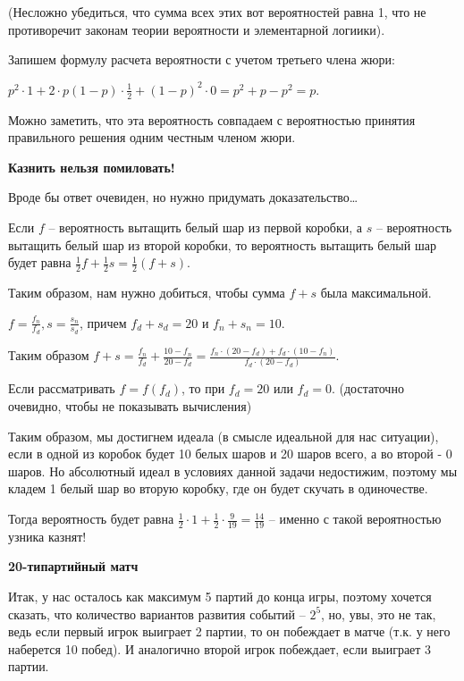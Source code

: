 \documentclass[12pt]{extreport}
\theoremstyle{definiton}
\theoremstyle{definition}
\theoremstyle{definition}
\newcounter{problem}
\newcounter{subproblem}
\def\beforPRskip{
    \bigskip
}
\def\pr{\beforPRskip\noindent\stepcounter{problem}{\bf \theproblem .\;}\setcounter{subproblem}{0}}
\begin{document}
        (Несложно убедиться, что сумма всех этих вот вероятностей равна 1, что не противоречит законам теории вероятности и элементарной логиики).

        Запишем формулу расчета вероятности с учетом третьего члена жюри:

        $p^2 \cdot 1 + 2 \cdot p(1-p) \cdot \frac{1}{2} + (1-p)^2 \cdot 0 = p^2 + p - p^2 = p$.

        Можно заметить, что эта вероятность совпадаем с вероятностью принятия правильного решения одним честным членом жюри.

    \pr \textbf{Казнить нельзя помиловать!}

        Вроде бы ответ очевиден, но нужно придумать доказательство\ldots

        Если $f$ -- вероятность вытащить белый шар из первой коробки, а $s$ -- вероятность вытащить белый шар из второй коробки, то
        вероятность вытащить белый шар будет равна $\frac{1}{2}f + \frac{1}{2}s = \frac{1}{2}(f + s)$.

        Таким образом, нам нужно добиться, чтобы сумма $f + s$ была максимальной.

        $f = \frac{f_n}{f_d}, s = \frac{s_n}{s_d}$, причем $f_d + s_d = 20$ и $f_n + s_n = 10$.

        Таким образом $f + s = \frac{f_n}{f_d} + \frac{10 - f_n}{20 - f_d} = \frac{f_n \cdot (20 - f_d) + f_d \cdot (10 - f_n)}{f_d \cdot (20 - f_d)}$.

        Если рассматривать $f = f(f_d)$, то при $f_d = 20$ или $f_d = 0$. (достаточно очевидно, чтобы не показывать вычисления)

        Таким образом, мы достигнем идеала (в смысле идеальной для нас ситуации), если в одной из коробок будет 10 белых шаров и 20 шаров всего, а во второй - 0 шаров.
        Но абсолютный идеал в условиях данной задачи недостижим, поэтому мы кладем 1 белый шар во вторую коробку, где он будет скучать в одиночестве.

        Тогда вероятность будет равна $\frac{1}{2} \cdot 1 + \frac{1}{2} \cdot \frac{9}{19} = \frac{14}{19}$ -- именно с такой вероятностью узника казнят!

    \pr \textbf{20-типартийный матч}

        Итак, у нас осталось как максимум 5 партий до конца игры, поэтому хочется сказать, что количество вариантов развития событий -- $2^5$,
        но, увы, это не так, ведь если первый игрок выиграет 2 партии, то он побеждает в матче (т.к. у него наберется 10 побед).
        И аналогично второй игрок побеждает, если выиграет 3 партии.
\end{document}
